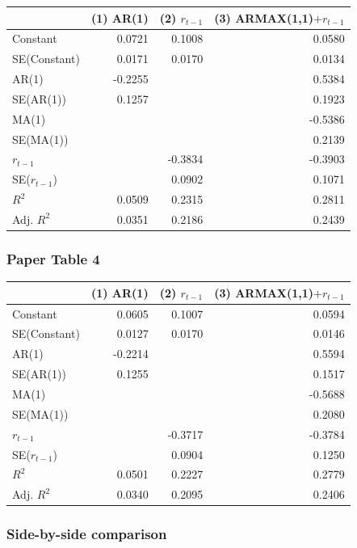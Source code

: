 \documentclass[11pt]{article}
\begin{document}
{\def\LTcaptype{none} %
\begin{longtable}[]{@{}lrrr@{}}
\toprule\noalign{}
& (1) AR(1) & (2) \(r_{t-1}\) & (3) ARMAX(1,1)\(+r_{t-1}\) \\
\midrule\noalign{}
\endhead
\bottomrule\noalign{}
\endlastfoot
Constant & 0.0721 & 0.1008 & 0.0580 \\
SE(Constant) & 0.0171 & 0.0170 & 0.0134 \\
AR(1) & -0.2255 & & 0.5384 \\
SE(AR(1)) & 0.1257 & & 0.1923 \\
MA(1) & & & -0.5386 \\
SE(MA(1)) & & & 0.2139 \\
\(r_{t-1}\) & & -0.3834 & -0.3903 \\
SE(\(r_{t-1}\)) & & 0.0902 & 0.1071 \\
\(R^2\) & 0.0509 & 0.2315 & 0.2811 \\
Adj. \(R^2\) & 0.0351 & 0.2186 & 0.2439 \\
\end{longtable}
}

\subsubsection{Paper Table 4}\label{paper-table-4}

{\def\LTcaptype{none} %
\begin{longtable}[]{@{}lrrr@{}}
\toprule\noalign{}
& (1) AR(1) & (2) \(r_{t-1}\) & (3) ARMAX(1,1)\(+r_{t-1}\) \\
\midrule\noalign{}
\endhead
\bottomrule\noalign{}
\endlastfoot
Constant & 0.0605 & 0.1007 & 0.0594 \\
SE(Constant) & 0.0127 & 0.0170 & 0.0146 \\
AR(1) & -0.2214 & & 0.5594 \\
SE(AR(1)) & 0.1255 & & 0.1517 \\
MA(1) & & & -0.5688 \\
SE(MA(1)) & & & 0.2080 \\
\(r_{t-1}\) & & -0.3717 & -0.3784 \\
SE(\(r_{t-1}\)) & & 0.0904 & 0.1250 \\
\(R^2\) & 0.0501 & 0.2227 & 0.2779 \\
Adj. \(R^2\) & 0.0340 & 0.2095 & 0.2406 \\
\end{longtable}
}

\subsubsection{Side-by-side comparison}\label{side-by-side-comparison}
\end{document}
